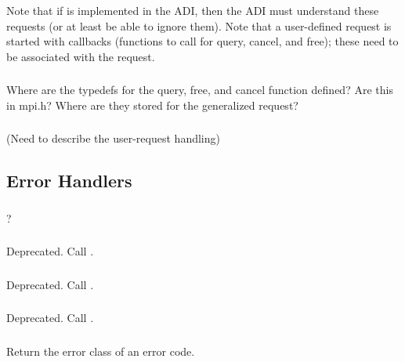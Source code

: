 \documentclass{article}
\begin{document}
Note that if  is implemented in the ADI, then the
ADI must understand these requests (or at least be able to ignore
them).
Note that a user-defined request is started with callbacks (functions
to call for query, cancel, and free); these need to be associated with
the request.  

\subsubsection{}
Where are the typedefs for the query, free, and cancel function defined? 
Are this in mpi.h?  Where are they stored for the generalized request?

\subsubsection{}

(Need to describe the user-request handling)

\subsection{Error Handlers}


\subsubsection{}
?

\subsubsection{}
Deprecated.  Call .

\subsubsection{}
Deprecated.  Call .

\subsubsection{}
Deprecated.  Call .

\subsubsection{}
Return the error class of an error code.
\end{document}
